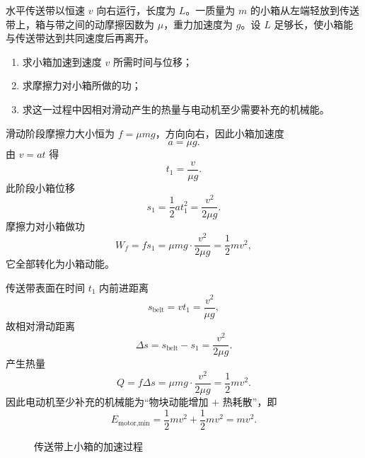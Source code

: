 \begin{classic}
水平传送带以恒速 $v$ 向右运行，长度为 $L$。一质量为 $m$ 的小箱从左端轻放到传送带上，箱与带之间的动摩擦因数为 $\mu$，重力加速度为 $g$。设 $L$ 足够长，使小箱能与传送带达到共同速度后再离开。
\begin{enumerate}
  \item 求小箱加速到速度 $v$ 所需时间与位移；
  \item 求摩擦力对小箱所做的功；
  \item 求这一过程中因相对滑动产生的热量与电动机至少需要补充的机械能。
\end{enumerate}
\begin{solution}
滑动阶段摩擦力大小恒为 $f=\mu mg$，方向向右，因此小箱加速度
\[
a=\mu g.
\]
由 $v=at$ 得
\[
t_1=\frac{v}{\mu g}.
\]
此阶段小箱位移
\[
s_1=\frac12 at_1^2=\frac{v^2}{2\mu g}.
\]
摩擦力对小箱做功
\[
W_f=fs_1=\mu mg\cdot \frac{v^2}{2\mu g}=\frac12 mv^2,
\]
它全部转化为小箱动能。

传送带表面在时间 $t_1$ 内前进距离
\[
s_{\text{belt}}=vt_1=\frac{v^2}{\mu g},
\]
故相对滑动距离
\[
\Delta s=s_{\text{belt}}-s_1=\frac{v^2}{2\mu g}.
\]
产生热量
\[
Q=f\Delta s=\mu mg\cdot \frac{v^2}{2\mu g}=\frac12 mv^2.
\]
因此电动机至少补充的机械能为“物块动能增加 $+$ 热耗散”，即
\[
E_{\text{motor,min}}=\frac12 mv^2+\frac12 mv^2=mv^2.
\]

\begin{figure}[H]
\centering
{}
\caption{传送带上小箱的加速过程}
\end{figure}
\end{solution}
\end{classic}

